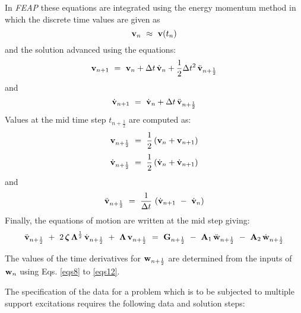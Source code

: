 In {\sl FEAP} these equations are integrated using the energy momentum
method in which the discrete time values are given as
\begin{equation}
\label{eqs7}
\mathbf{v}_n  ~ \approx ~  \mathbf{v}(t_n)
\end{equation}
and the solution advanced using the equations:
\begin{equation}
\label{eqs8}
\mathbf{v}_{n+1} ~=~ \mathbf{v}_n + \Delta t \, \dot{\mathbf{v}}_n + \frac{1}{2} \Delta t^2
\, \ddot{\mathbf{v}}_{n+\frac{1}{2}}
\end{equation}
and
\begin{equation}
\label{eqs9}
\dot{\mathbf{v}}_{n+1} ~=~ \dot{\mathbf{v}}_n + \Delta t \, \ddot{\mathbf{v}}_{n+\frac{1}{2}}
\end{equation}
Values at the mid time step $t_{n+\frac{1}{2}}$ are computed as:
\begin{equation}
\label{eqs10}
\mathbf{v}_{n+\frac{1}{2}} ~=~
\frac{1}{2} \left( \mathbf{v}_n + \mathbf{v}_{n+1} \right)
\end{equation}
\begin{equation}
\label{eqs11}
\dot{\mathbf{v}}_{n+\frac{1}{2}} ~=~
\frac{1}{2} \left( \dot{\mathbf{v}}_n + \dot{\mathbf{v}}_{n+1} \right)
\end{equation}
and
\begin{equation}
\label{eqs12}
\ddot{\mathbf{v}}_{n+\frac{1}{2}} ~=~ \frac{1}{\Delta t} \, \left(
\dot{\mathbf{v}}_{n+1} ~-~ \dot{\mathbf{v}}_n \right)
\end{equation}
Finally, the equations of motion are written at the mid step
giving:
\begin{equation}
\label{eqs13}
\ddot{\mathbf{v}}_{n+\frac{1}{2}} ~+~ 2 \, \boldsymbol{\zeta} \,
\boldsymbol{\Lambda}^{\frac{1}{2}} \, \dot{\mathbf{v}}_{n+\frac{1}{2}}
~+~ \boldsymbol{\Lambda} \, \mathbf{v}_{n+\frac{1}{2}} ~=~ \mathbf{G}_{n+\frac{1}{2}} ~-~
\mathbf{A}_1 \, \ddot{\mathbf{w}}_{n+\frac{1}{2}}~-~
\mathbf{A}_2 \, \dot{\mathbf{w}}_{n+\frac{1}{2}}
\end{equation}

The values of the time derivatives for $\mathbf{w}_{n+\frac{1}{2}}$ are determined
from the inputs of $\mathbf{w}_n$ using Eqs. \ref{eqs8} to \ref{eqs12}.

The specification of the data for a problem which is to be subjected to
multiple support excitations requires the following data and solution steps:

